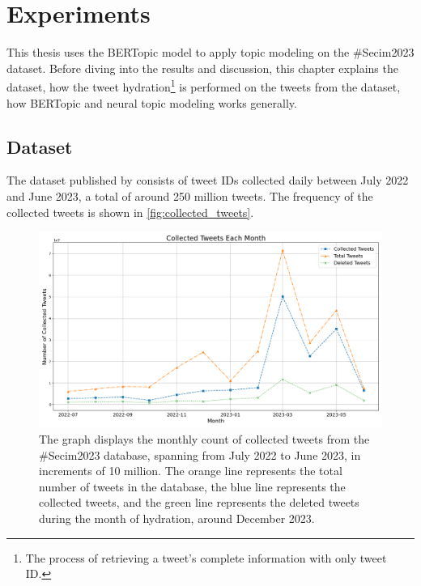 
\chapter{Experiments}\label{chapter:experiments}

This thesis uses the BERTopic model to apply topic modeling on the \#Secim2023 dataset. 
Before diving into the results and discussion, this chapter explains the dataset, 
how the tweet hydration\footnote{The process of retrieving a tweet's complete information
with only tweet ID.} is performed on the tweets from the dataset, how BERTopic and 
neural topic modeling works generally.

\section{Dataset}

The dataset published by \textcite{secim2023} consists of tweet IDs collected daily 
between July 2022 and June 2023, a total of around 250 million tweets. 
The frequency of the collected tweets is shown in \autoref{fig:collected_tweets}.

\begin{figure}[htb]
    \centering
    \includegraphics[width=\linewidth]{figures/collected_tweets_2.png}
    \caption[Collected Tweets Each Month]
    {The graph displays the monthly count of collected tweets from the \#Secim2023 database, 
    spanning from July 2022 to June 2023, in increments of 10 million.
    The orange line represents the total number of tweets in the database, 
    the blue line represents the collected tweets, and 
    the green line represents the deleted tweets during the month of hydration, around
    December 2023.}\label{fig:collected_tweets}
\end{figure}

